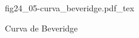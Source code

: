 \begin{figure}[h]
\centering
\def\svgwidth{0.5\textwidth}
{fig24_05-curva_beveridge.pdf_tex}
\caption{Curva de Beveridge}
\label{fig24_05-curva_beveridge}
\end{figure}